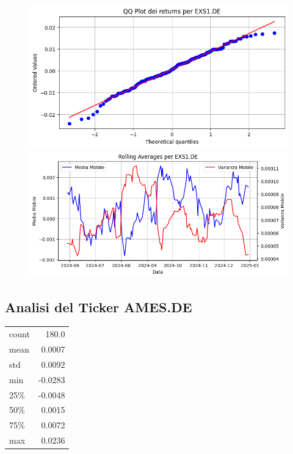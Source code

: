 \documentclass{article}%
\begin{document}
%


\begin{figure}[htbp]%
\begin{minipage}{0.48\textwidth}%
\includegraphics[width=\linewidth]{immagini_tickers/EXS1.DE_qq_plot.png}%
\end{minipage}%
\begin{minipage}{0.48\textwidth}%
\includegraphics[width=\linewidth]{immagini_tickers/EXS1.DE_rolling_averages.png}%
\end{minipage}%
\end{figure}

%
\subsection*{Analisi del Ticker AMES.DE}%
\label{subsec:AnalisidelTickerAMES.DE}%
\begin{tabular}{lr}%
count&180.0\\%
mean&0.0007\\%
std&0.0092\\%
min&{-}0.0283\\%
25\%&{-}0.0048\\%
50\%&0.0015\\%
75\%&0.0072\\%
max&0.0236\\%
\end{tabular}%
\end{document}
